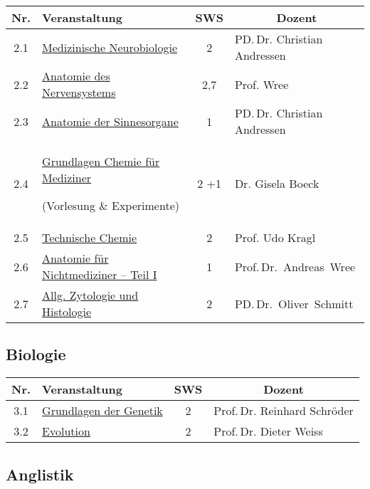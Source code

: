 \documentclass[%
a4paper, %
11pt,               %
leqno,              %
fleqn,              %
]
{scrartcl}
\begin{document}
\begin{tabularx}{\textwidth}{cXcp{5.6cm}}
  \textbf{Nr.} & \textbf{Veranstaltung} & \textbf{SWS} &
  \multicolumn{1}{c}{\textbf{Dozent}}\\
  \hline
  2.1 & \hyperref[ssub:Medizinische Neurobiologie]{Medizinische Neurobiologie} &
    2 & PD.\,Dr. Christian Andressen\\
  2.2 & \hyperref[ssub:Anatomie des Nervensystems]{Anatomie des Nervensystems} &
  2,7 & Prof. Wree\\
  2.3 & \hyperref[ssub:Anatomie der Sinnesorgane]{Anatomie der Sinnesorgane} & 1
      & PD.\,Dr. Christian Andressen\\
  2.4 & \hyperref[ssub:Grundlagen Chemie für Mediziner]{Grundlagen Chemie für
Mediziner}

  (Vorlesung \& Experimente) & 2 +1 & Dr.
  Gisela Boeck\\
  2.5 & \hyperref[ssub:Technische Chemie]{Technische Chemie} & 2 & Prof. Udo
  Kragl\\
  2.6 & \hyperref[ssub:Anatomie für Nichtmediziner -- Teil I]{Anatomie für
  Nichtmediziner -- Teil I} & 1 & Prof.\,Dr. Andreas Wree\\
  2.7 & \hyperref[ssub:Allg. Zytologie und Histologie]{Allg. Zytologie und
  Histologie} & 2 & PD.\,Dr. Oliver Schmitt\\
\end{tabularx}


\subsection{Biologie} %
\label{sec:Biologie}

\begin{tabularx}{\textwidth}{cXcp{5.6cm}}
  \textbf{Nr.} & \textbf{Veranstaltung} & \textbf{SWS} &
  \multicolumn{1}{c}{\textbf{Dozent}}\\
  \hline
  3.1 & \hyperref[ssub:Grundlagen der Genetik]{Grundlagen der Genetik} & 2 &
  Prof.\,Dr. Reinhard Schröder\\
  3.2 & \hyperref[ssub:Evolution]{Evolution} & 2 & Prof.\,Dr. Dieter Weiss\\
\end{tabularx}


\subsection{Anglistik} %
\label{sec:Anglistik}
\end{document}
